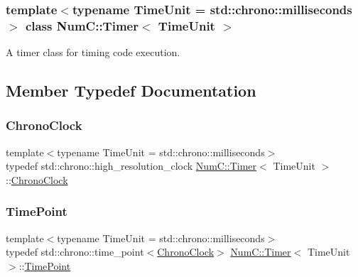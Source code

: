 \subsubsection*{template$<$typename Time\+Unit = std\+::chrono\+::milliseconds$>$\newline
class Num\+C\+::\+Timer$<$ Time\+Unit $>$}

A timer class for timing code execution. 

\subsection{Member Typedef Documentation}
\mbox{\label{class_num_c_1_1_timer_ad7fe9141913b325f99723ccb0ca2e13f}} 
\subsubsection{\texorpdfstring{Chrono\+Clock}{ChronoClock}}
{\footnotesize\ttfamily template$<$typename Time\+Unit  = std\+::chrono\+::milliseconds$>$ \\
typedef std\+::chrono\+::high\+\_\+resolution\+\_\+clock \mbox{\hyperlink{class_num_c_1_1_timer}{Num\+C\+::\+Timer}}$<$ Time\+Unit $>$\+::\mbox{\hyperlink{class_num_c_1_1_timer_ad7fe9141913b325f99723ccb0ca2e13f}{Chrono\+Clock}}}

\mbox{\label{class_num_c_1_1_timer_a7a420ddcb94302d75becdfbdbb9a6b8b}} 
\subsubsection{\texorpdfstring{Time\+Point}{TimePoint}}
{\footnotesize\ttfamily template$<$typename Time\+Unit  = std\+::chrono\+::milliseconds$>$ \\
typedef std\+::chrono\+::time\+\_\+point$<$\mbox{\hyperlink{class_num_c_1_1_timer_ad7fe9141913b325f99723ccb0ca2e13f}{Chrono\+Clock}}$>$ \mbox{\hyperlink{class_num_c_1_1_timer}{Num\+C\+::\+Timer}}$<$ Time\+Unit $>$\+::\mbox{\hyperlink{class_num_c_1_1_timer_a7a420ddcb94302d75becdfbdbb9a6b8b}{Time\+Point}}}



